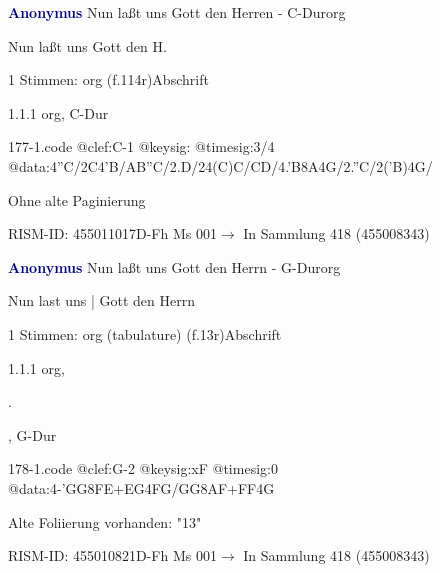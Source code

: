 \documentclass[twocolumn]{book}
\begin{document}
\par \vspace{7pt} \textcolor{darkblue}{\textbf{Anonymus  }}\hfillplus{\textbf{[177]}}\newline Nun laßt uns Gott den Herren - C-Dur\newline org
\par \begin{itshape}[f.114r, heading:] Nun laßt uns Gott den H.\end{itshape} 
\par \textcolor{darkblue}{}  1 Stimmen: org  (f.114r)\newline Abschrift
\par 1.1.1  org, C-Dur  
\begin{filecontents*}{177-1.code}
@clef:C-1
@keysig:
@timesig:3/4
@data:4''C/2C4'B/AB''C/2.D/24(C)C/CD/4.'B8A4G/2.''C/2('B)4G/
\end{filecontents*}
\newline
%
\par Ohne alte Paginierung
\par RISM-ID: 455011017\newline D-Fh  Ms 001\newline $\rightarrow$ In Sammlung 418 (455008343)
      
\par \vspace{7pt} \textcolor{darkblue}{\textbf{Anonymus  }}\hfillplus{\textbf{[178]}}\newline Nun laßt uns Gott den Herrn - G-Dur\newline org
\par \begin{itshape}[f.13r, at left:] Nun last uns | Gott den Herrn\end{itshape} 
\par \textcolor{darkblue}{}  1 Stimmen: org (tabulature)  (f.13r)\newline Abschrift
\par 1.1.1  org, \begin{itshape}.\end{itshape}, G-Dur  
\begin{filecontents*}{178-1.code}
@clef:G-2
@keysig:xF
@timesig:0
@data:4-'GG{8FE+}{EG}4FG/GG{8AF+}{FF}4G
\end{filecontents*}
\newline
%
\par Alte Foliierung vorhanden: "13"
\par RISM-ID: 455010821\newline D-Fh  Ms 001\newline $\rightarrow$ In Sammlung 418 (455008343)
      
\end{document}
